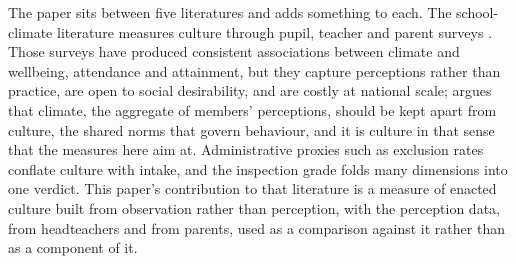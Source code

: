 The paper sits between five literatures and adds something to each. The
school-climate literature measures culture through pupil, teacher and parent
surveys \citep{hoy2001,cohen2009,thapa2013}. Those surveys have produced
consistent associations between climate and wellbeing, attendance and
attainment, but they capture perceptions rather than practice, are open to
social desirability, and are costly at national scale; \citet{vanhoutte2005}
argues that climate, the aggregate of members' perceptions, should be kept
apart from culture, the shared norms that govern behaviour, and it is culture
in that sense that the measures here aim at. Administrative proxies such as
exclusion rates \citep{machin2020} conflate culture with intake, and the
inspection grade folds many dimensions into one verdict. This paper's
contribution to that literature is a measure of enacted culture built from
observation rather than perception, with the perception data, from
headteachers and from parents, used as a comparison against it rather than as
a component of it.

